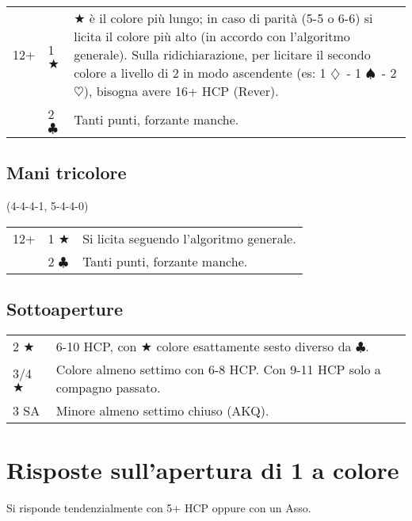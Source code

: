 \documentclass[a4paper,10pt]{article}
\renewcommand{\c}{$\clubsuit$\xspace}
\renewcommand{\d}{$\diamondsuit$\xspace}
\newcommand{\h}{$\heartsuit$\xspace}
\newcommand{\s}{$\spadesuit$\xspace}
\renewcommand{\j}{$\bigstar$\xspace}
\newcommand{\sa}{SA\xspace}
\newcommand{\smallspace}{\vskip0.3cm}
\newenvironment{twocol}
  {\smallspace\noindent\begin{tabular}{l p{0.78\textwidth}}}
  {\end{tabular}\smallspace}
\newenvironment{threecol}
  {\smallspace\noindent\begin{tabular}{l l p{0.78\textwidth}}}
  {\end{tabular}\smallspace}
\begin{document}
\begin{threecol}
 12+ & 1 \j & \j è il colore più lungo; in caso di parità (5-5 o 6-6) si licita il colore più alto (in accordo con l'algoritmo generale). Sulla ridichiarazione, per licitare il secondo colore a livello di 2 in modo ascendente (es: 1 \d\ - 1 \s\ - 2 \h), bisogna avere 16+ HCP (Rever).\\
 & 2 \c & Tanti punti, forzante manche.
\end{threecol}


\subsection{Mani tricolore}
(4-4-4-1, 5-4-4-0)

\begin{threecol}
 12+ & 1 \j & Si licita seguendo l'algoritmo generale.\\
 & 2 \c & Tanti punti, forzante manche.
\end{threecol}


\subsection{Sottoaperture}

\begin{twocol}
 2 \j & 6-10 HCP, con \j colore esattamente sesto diverso da \c.\\
 3/4 \j & Colore almeno settimo con 6-8 HCP. Con 9-11 HCP solo a compagno passato.\\
 3 \sa & Minore almeno settimo chiuso (AKQ).
\end{twocol}



\pagebreak

\section{Risposte sull'apertura di 1 a colore}

Si risponde tendenzialmente con 5+ HCP oppure con un Asso.
\end{document}
